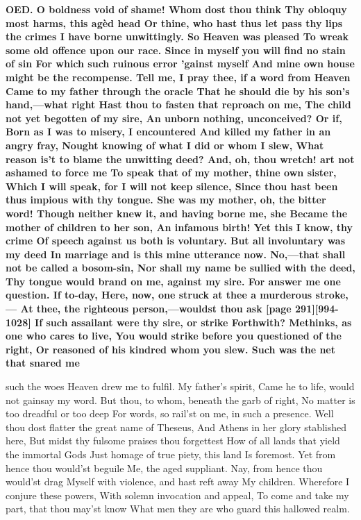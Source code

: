 \documentclass[11pt,letter]{book}
\begin{document}
\par \textbf{OED. O boldness void of shame! Whom dost thou think Thy obloquy most harms, this agèd head Or thine, who hast thus let pass thy lips the crimes I have borne unwittingly. So Heaven was pleased To wreak some old offence upon our race. Since in myself you will find no stain of sin For which such ruinous error ’gainst myself And mine own house might be the recompense. Tell me, I pray thee, if a word from Heaven Came to my father through the oracle That he should die by his son’s hand,—what right Hast thou to fasten that reproach on me, The child not yet begotten of my sire, An unborn nothing, unconceived? Or if, Born as I was to misery, I encountered And killed my father in an angry fray, Nought knowing of what I did or whom I slew, What reason is’t to blame the unwitting deed? And, oh, thou wretch! art not ashamed to force me To speak that of my mother, thine own sister, Which I will speak, for I will not keep silence, Since thou hast been thus impious with thy tongue. She was my mother, oh, the bitter word! Though neither knew it, and having borne me, she Became the mother of children to her son, An infamous birth! Yet this I know, thy crime Of speech against us both is voluntary. But all involuntary was my deed In marriage and is this mine utterance now. No,—that shall not be called a bosom-sin, Nor shall my name be sullied with the deed, Thy tongue would brand on me, against my sire. For answer me one question. If to-day, Here, now, one struck at thee a murderous stroke,— At thee, the righteous person,—wouldst thou ask [page 291][994-1028] If such assailant were thy sire, or strike Forthwith? Methinks, as one who cares to live, You would strike before you questioned of the right, Or reasoned of his kindred whom you slew. Such was the net that snared me}
\par   such the woes Heaven drew me to fulfil. My father’s spirit, Came he to life, would not gainsay my word. But thou, to whom, beneath the garb of right, No matter is too dreadful or too deep For words, so rail’st on me, in such a presence. Well thou dost flatter the great name of Theseus, And Athens in her glory stablished here, But midst thy fulsome praises thou forgettest How of all lands that yield the immortal Gods Just homage of true piety, this land Is foremost. Yet from hence thou would’st beguile Me, the aged suppliant. Nay, from hence thou would’st drag Myself with violence, and hast reft away My children. Wherefore I conjure these powers, With solemn invocation and appeal, To come and take my part, that thou may’st know What men they are who guard this hallowed realm.
\end{document}
